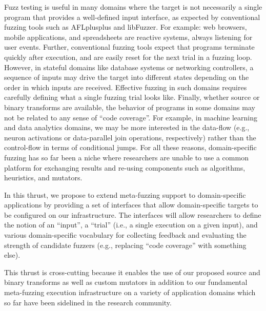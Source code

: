 Fuzz testing is useful in many domains where the target is not necessarily a single program that
provides a well-defined input interface, as expected by conventional fuzzing tools such as
AFLplusplus and libFuzzer. For example: web browsers, mobile applications, and spreadsheets 
are reactive systems, always listening for user events. Further, conventional fuzzing tools 
expect that programs terminate quickly after execution, and are easily reset 
for the next trial in a fuzzing loop. However, in stateful domains like database systems 
or networking controllers, a sequence of inputs may drive the target into different states
depending on the order in which inputs are received. Effective fuzzing in such domains requires
carefully defining what a single fuzzing trial looks like. Finally, whether source or binary 
transforms are available, the behavior of programs in some domains may not be related to
any sense of ``code coverage''. For example, in machine learning and data analytics domains,
we may be more interested in the data-flow (e.g., neuron activations or 
data-parallel join operations, respectively) rather than the control-flow in terms of 
conditional jumps. For all these reasons, domain-specific fuzzing has so far been a niche where
researchers are unable to use a common platform for exchanging results and re-using components
such as algorithms, heuristics, and mutators.

In this thrust, we propose to extend meta-fuzzing support to domain-specific applications by
providing a set of interfaces that allow domain-specific targets to be configured on our
infrastructure. The interfaces will allow researchers to define the notion of an ``input'',
a ``trial'' (i.e., a single execution on a given input), and various domain-specific vocabulary
for collecting feedback and evaluating the strength of candidate fuzzers (e.g., replacing ``code
coverage'' with something else). 

This thrust is cross-cutting because it enables the use of our proposed source and binary 
transforms as well as custom mutators in addition to our fundamental meta-fuzzing execution
infrastructure on a variety of application domains which so far have been 
sidelined in the research community.

